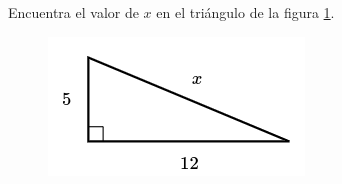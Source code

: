 Encuentra el valor de $x$ en el triángulo de la figura \ref{fig:lados_pitagoras_03}.

\begin{minipage}[t][][t]{0.35\textwidth}
    \begin{figure}[H]
        \centering
        \includegraphics[width=0.9\linewidth]{../images/lados_pitagoras_03.png}
        \caption{}
        \label{fig:lados_pitagoras_03}
    \end{figure}
\end{minipage}\hfill
